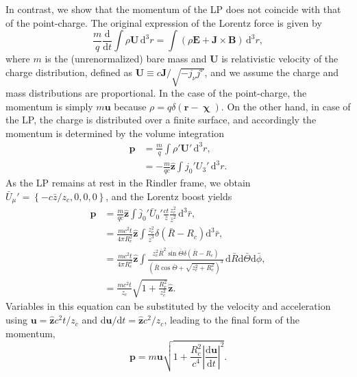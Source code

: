 \documentclass[a4paper,fleqn]{cas-sc}
\begin{document}
In contrast, we show that the momentum of the LP does not coincide with that of the point-charge. The original expression of the Lorentz force is given by
\begin{equation}
\displaystyle\frac{m}{q} \displaystyle\frac{\mathrm{d}}{\mathrm{d} t} \int \rho \mathbf{U} \,\mathrm{d}^{3}r = \int (\rho \mathbf{E} + \mathbf{J} \times \mathbf{B}) \,\mathrm{d}^{3}r , \label{eq:Lorentz}
\end{equation}
where $m$ is the (unrenormalized) bare mass and $\mathbf{U}$ is relativistic velocity of the charge distribution, defined as $\mathbf{U} \equiv c\mathbf{J} / \sqrt{-j_{\nu}j^{\nu}}$, and we assume the charge and mass distributions are proportional. In the case of the point-charge, the momentum is simply $m\mathbf{u}$ because $\rho = q\delta\left(\mathbf{r}-\boldsymbol{\upchi}\right)$. On the other hand, in case of the LP, the charge is distributed over a finite surface, and accordingly the momentum is determined by the volume integration
\begin{align}
\mathbf{p} &= \displaystyle\frac{m}{q} \int \rho' \mathbf{U}' \,\mathrm{d}^{3}r , \nonumber \\
&= -\displaystyle\frac{m}{qc} \hat{\mathbf{z}} \int j_{0}' U_{3}' \,\mathrm{d}^{3}r .
\end{align}
As the LP remains at rest in the Rindler frame, we obtain $\bar{U}_{\mu}' = \left\{-c\bar{z}/z_{c},0,0,0\right\}$, and the Lorentz boost yields
\begin{align}
\mathbf{p} &= \displaystyle\frac{m}{qc} \hat{\mathbf{z}} \int \bar{j}_{0}' \bar{U}_{0}' \displaystyle\frac{ct}{\bar{z}} \displaystyle\frac{z_{c}^{2}}{\bar{z}^{2}} \,\mathrm{d}^{3}\bar{r} , \nonumber \\
&= \displaystyle\frac{mc^{2}t}{4\pi R_{c}^{2}} \hat{\mathbf{z}} \int \displaystyle\frac{z_{c}^{2}}{\bar{z}^{3}} \delta\left(\bar{R}-R_{c}\right) \mathrm{d}^{3}\bar{r} , \nonumber \\
&= \displaystyle\frac{mc^{2}t}{4\pi R_{c}^{2}} \hat{\mathbf{z}} \int \displaystyle\frac{z_{c}^{2}\bar{R}^{2}\sin\bar{\Theta} \delta\left(\bar{R}-R_{c}\right)}{\left(\bar{R}\cos\bar{\Theta} + \sqrt{z_{c}^{2}+R_{c}^{2}}\right)^{3}} \,\mathrm{d}\bar{R}\mathrm{d}\bar{\Theta}\mathrm{d}\bar{\phi} , \nonumber \\
&= \displaystyle\frac{mc^{2}t}{z_{c}} \sqrt{1 + \displaystyle\frac{R_{c}^{2}}{z_{c}^{2}}} \hat{\mathbf{z}} .
\end{align}
Variables in this equation can be substituted by the velocity and acceleration using $\mathbf{u} = \hat{\mathbf{z}}c^{2}t/z_{c}$ and $\mathrm{d}\mathbf{u}/\mathrm{d}t = \hat{\mathbf{z}}c^{2}/z_{c}$, leading to the final form of the momentum,
\begin{equation}
\mathbf{p} = m\mathbf{u} \sqrt{1 + \displaystyle\frac{R_{c}^{2}}{c^{4}} \left|\displaystyle\frac{\mathrm{d}\mathbf{u}}{\mathrm{d}t}\right|^{2}} . \label{eq:momentum}
\end{equation}
\end{document}
